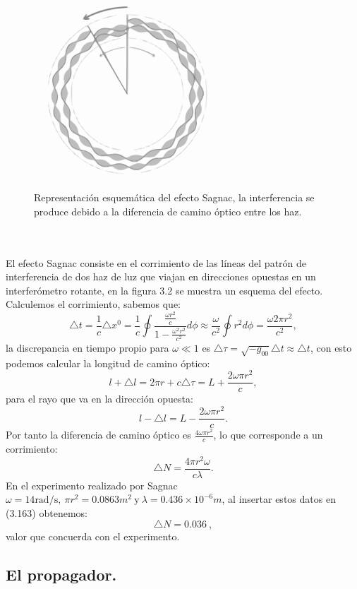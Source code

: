 \begin{figure}[h!]
\centering
\includegraphics[width=7cm]{Imagenes/Fig18}
\caption[Representación esquemática del efecto Sagnac.]{Representación esquemática del efecto Sagnac, la interferencia se produce debido a la diferencia de camino óptico entre los haz.}
\end{figure}
\\
\\
El efecto Sagnac consiste en el corrimiento de las líneas del patrón de interferencia de dos haz de luz que viajan en direcciones opuestas en un interferómetro rotante, en la figura 3.2 se muestra un esquema del efecto. Calculemos el corrimiento, sabemos que:
\begin{equation}
\triangle t=\frac{1}{c}\triangle x^{0}=\frac{1}{c}\oint\frac{\frac{\omega r^{2}}{c}}{1-\frac{\omega^{2}r^{2}}{c^{2}}}d\phi\approx\frac{\omega}{c^{2}}\oint r^{2}d\phi=\frac{\omega2\pi r^{2}}{c^{2}},
\end{equation}
la discrepancia en tiempo propio para $\omega \ll 1$ es $\triangle \tau =\sqrt{-g_{00}}\triangle t\approx \triangle t$, con esto podemos calcular la longitud de camino óptico:
\begin{equation}
l+\triangle l=2\pi r+c\triangle \tau =L+\frac{2\omega \pi r^2}{c},
\end{equation}  
para el rayo que va en la dirección opuesta:
\begin{equation}
l-\triangle l=L-\frac{2\omega \pi r^2}{c}.
\end{equation}
Por tanto la diferencia de camino óptico es $\frac{4\omega \pi r^2}{c}$, lo que corresponde a un corrimiento:
\begin{equation}
\triangle N= \frac{4\pi r^2\omega}{c\lambda}.
\end{equation}
En el experimento realizado por Sagnac $\omega=14\text{rad/s},\ \pi r^2=0.0863 m^2\ \text{y}\ \lambda=0.436\times10^{-6}m$, al insertar estos datos en (3.163) obtenemos:
\begin{equation}
\triangle N=0.036\ ,
\end{equation}
valor que concuerda con el experimento.
\subsection{El propagador.}


